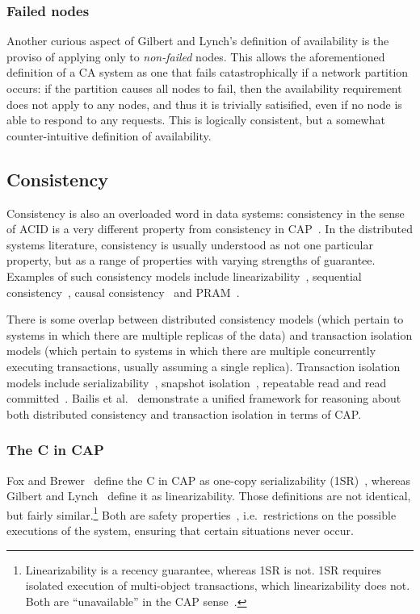 \documentclass[a4paper,twocolumn,10pt]{article}
\begin{document}
\subsubsection{Failed nodes}\label{sec:failed-node-exception}

Another curious aspect of Gilbert and Lynch's definition of availability is the proviso of applying
only to \emph{non-failed} nodes. This allows the aforementioned definition of a CA system as one
that fails catastrophically if a network partition occurs: if the partition causes all nodes to
fail, then the availability requirement does not apply to any nodes, and thus it is trivially
satisified, even if no node is able to respond to any requests. This is logically consistent, but a
somewhat counter-intuitive definition of availability.

\subsection{Consistency}\label{sec:consistency}

Consistency is also an overloaded word in data systems: consistency in the sense of ACID is a very
different property from consistency in CAP~\cite{Brewer2012ba}. In the distributed systems
literature, consistency is usually understood as not one particular property, but as a range of
properties with varying strengths of guarantee. Examples of such consistency models include
linearizability~\cite{Herlihy1990jq}, sequential consistency~\cite{Lamport1979ky}, causal
consistency~\cite{Ahamad1995gl} and PRAM~\cite{Lipton1988uh}.

There is some overlap between distributed consistency models (which pertain to systems in which
there are multiple replicas of the data) and transaction isolation models (which pertain to systems
in which there are multiple concurrently executing transactions, usually assuming a single replica).
Transaction isolation models include serializability~\cite{Bernstein1987va}, snapshot
isolation~\cite{Berenson1995kj}, repeatable read and read committed~\cite{Gray1976us}. Bailis et
al.~\cite{Bailis2014vc} demonstrate a unified framework for reasoning about both distributed
consistency and transaction isolation in terms of CAP.

\subsubsection{The C in CAP}\label{sec:c-in-cap}

Fox and Brewer~\cite{Fox1999bs} define the C in CAP as one-copy serializability
(1SR)~\cite{Bernstein1987va}, whereas Gilbert and Lynch~\cite{Gilbert2002il} define it as
linearizability. Those definitions are not identical, but fairly similar.\footnote{Linearizability
is a recency guarantee, whereas 1SR is not. 1SR requires isolated execution of multi-object
transactions, which linearizability does not. Both are ``unavailable'' in the CAP
sense~\cite{Bailis2014vc}.} Both are safety properties~\cite{Alpern1985dg}, i.e.\ restrictions on
the possible executions of the system, ensuring that certain situations never occur.
\end{document}
